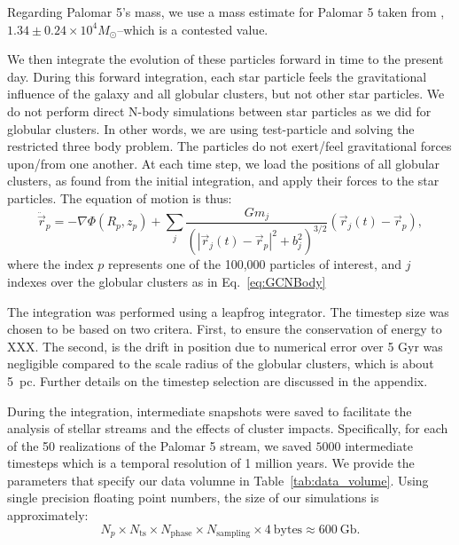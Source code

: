 \documentclass[draft]{aa}
\begin{document}
    Regarding Palomar 5's mass, we use a mass estimate for Palomar 5 taken from \citet{2021MNRAS.505.5957B}, $1.34\pm0.24\times10^{4}M_{\odot}$--which is a contested value. 
  

    We then integrate the evolution of these particles forward in time to the present day. During this forward integration, each star particle feels the gravitational influence of the galaxy and all globular clusters, but not other star particles. We do not perform direct N-body simulations between star particles as we did for globular clusters. In other words, we are using test-particle and solving the restricted three body problem. The particles do not exert/feel gravitational forces upon/from one another. At each time step, we load the positions of all globular clusters, as found from the initial integration, and apply their forces to the star particles. The equation of motion is thus: 
    \begin{equation}
      \ddot{\vec{r}}_p = -\nabla \Phi(R_p,z_p) + \left.\sum_{j} \frac{Gm_j}{\left(|\vec{r}_j(t) - \vec{r}_p|^2 + b_j^2\right)^{3/2}}\right. \left(\vec{r}_j(t)- \vec{r}_p\right),
      \end{equation} \label{eq:equation_of_motion_particle} where the index $p$ represents one of the 100,000 particles of interest, and $j$ indexes over the globular clusters as in Eq.~\ref{eq:GCNBody}

    The integration was performed using a leapfrog integrator. The timestep size was chosen to be based on two critera. First, to ensure the conservation of energy to XXX. The second, is the drift in position due to numerical error over 5 Gyr was negligible compared to the scale radius of the globular clusters, which is about 5~pc. Further details on the timestep selection are discussed in the appendix.

    During the integration, intermediate snapshots were saved to facilitate the analysis of stellar streams and the effects of cluster impacts. Specifically, for each of the 50 realizations of the Palomar 5 stream, we saved $5000$ intermediate timesteps which is a temporal resolution of 1 million years. We provide the parameters that specify our data volumne in Table~\ref{tab:data_volume}. Using single precision floating point numbers, the size of our simulations is approximately:
    \begin{equation} \label{eq:data_volume_estimate}
      N_p \times N_{\textrm{ts}}\times N_{\textrm{phase}}\times N_{\textrm{sampling}} \times 4~\textrm{bytes}\approx 600~\textrm{Gb}.
    \end{equation}
\end{document}
